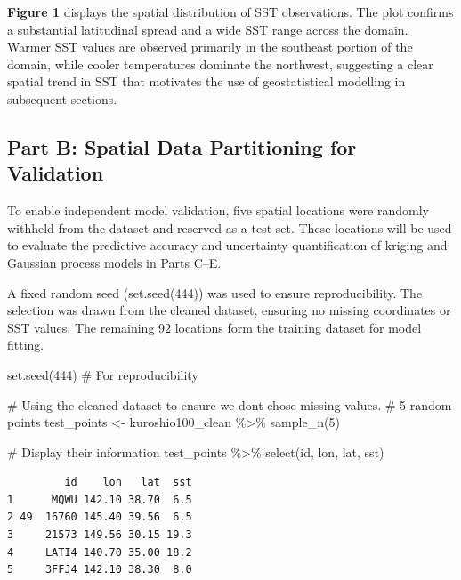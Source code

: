 \documentclass[
  11pt,
]{article}
\newenvironment{Shaded}{\begin{snugshade}}{\end{snugshade}}
\newcommand{\CommentTok}[1]{\textcolor[rgb]{0.37,0.37,0.37}{#1}}
\newcommand{\DecValTok}[1]{\textcolor[rgb]{0.68,0.00,0.00}{#1}}
\newcommand{\FunctionTok}[1]{\textcolor[rgb]{0.28,0.35,0.67}{#1}}
\newcommand{\NormalTok}[1]{\textcolor[rgb]{0.00,0.23,0.31}{#1}}
\newcommand{\OtherTok}[1]{\textcolor[rgb]{0.00,0.23,0.31}{#1}}
\newcommand{\SpecialCharTok}[1]{\textcolor[rgb]{0.37,0.37,0.37}{#1}}
\begin{document}
\textbf{Figure 1} displays the spatial distribution of SST observations.
The plot confirms a substantial latitudinal spread and a wide SST range
across the domain. Warmer SST values are observed primarily in the
southeast portion of the domain, while cooler temperatures dominate the
northwest, suggesting a clear spatial trend in SST that motivates the
use of geostatistical modelling in subsequent sections.

\subsection{Part B: Spatial Data Partitioning for
Validation}\label{part-b-spatial-data-partitioning-for-validation}

To enable independent model validation, five spatial locations were
randomly withheld from the dataset and reserved as a test set. These
locations will be used to evaluate the predictive accuracy and
uncertainty quantification of kriging and Gaussian process models in
Parts C--E.

A fixed random seed (set.seed(444)) was used to ensure reproducibility.
The selection was drawn from the cleaned dataset, ensuring no missing
coordinates or SST values. The remaining 92 locations form the training
dataset for model fitting.

\begin{Shaded}
\begin{Highlighting}[]
\FunctionTok{set.seed}\NormalTok{(}\DecValTok{444}\NormalTok{)  }\CommentTok{\# For reproducibility}

\CommentTok{\# Using the cleaned dataset to ensure we dont chose missing values.}
\CommentTok{\# 5 random points}
\NormalTok{test\_points }\OtherTok{\textless{}{-}}\NormalTok{ kuroshio100\_clean }\SpecialCharTok{\%\textgreater{}\%}
  \FunctionTok{sample\_n}\NormalTok{(}\DecValTok{5}\NormalTok{)}

\CommentTok{\# Display their information}
\NormalTok{test\_points }\SpecialCharTok{\%\textgreater{}\%}
  \FunctionTok{select}\NormalTok{(id, lon, lat, sst)}
\end{Highlighting}
\end{Shaded}

\begin{verbatim}
         id    lon   lat  sst
1      MQWU 142.10 38.70  6.5
2 49  16760 145.40 39.56  6.5
3     21573 149.56 30.15 19.3
4     LATI4 140.70 35.00 18.2
5     3FFJ4 142.10 38.30  8.0
\end{verbatim}
\end{document}

